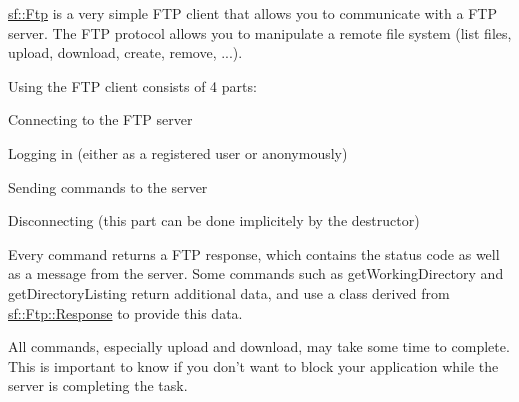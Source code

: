 \hyperlink{classsf_1_1Ftp}{sf\-::\-Ftp} is a very simple F\-T\-P client that allows you to communicate with a F\-T\-P server. The F\-T\-P protocol allows you to manipulate a remote file system (list files, upload, download, create, remove, ...).

Using the F\-T\-P client consists of 4 parts\-: \begin{DoxyItemize}
\item Connecting to the F\-T\-P server \item Logging in (either as a registered user or anonymously) \item Sending commands to the server \item Disconnecting (this part can be done implicitely by the destructor)\end{DoxyItemize}
Every command returns a F\-T\-P response, which contains the status code as well as a message from the server. Some commands such as get\-Working\-Directory and get\-Directory\-Listing return additional data, and use a class derived from \hyperlink{classsf_1_1Ftp_1_1Response}{sf\-::\-Ftp\-::\-Response} to provide this data.

All commands, especially upload and download, may take some time to complete. This is important to know if you don't want to block your application while the server is completing the task.

